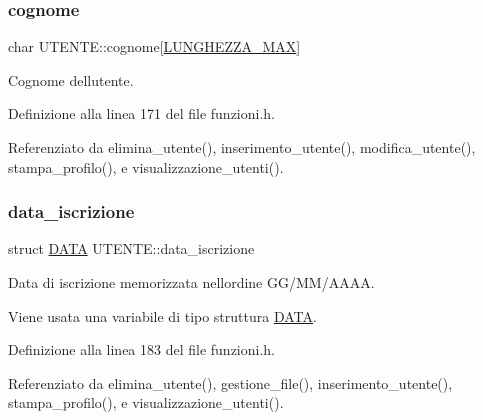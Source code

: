 \mbox{\label{struct_u_t_e_n_t_e_ad7797bd318a25af80b02a7751ebd4b9a}} 
\subsubsection{\texorpdfstring{cognome}{cognome}}
{\footnotesize\ttfamily char U\+T\+E\+N\+T\+E\+::cognome\mbox{[}\hyperlink{funzioni_8h_a2cdd71b92d6e869f8b094e32a6da6a62}{L\+U\+N\+G\+H\+E\+Z\+Z\+A\+\_\+\+M\+AX}\mbox{]}}

Cognome dell\textquotesingle{}utente. 

Definizione alla linea 171 del file funzioni.\+h.



Referenziato da elimina\+\_\+utente(), inserimento\+\_\+utente(), modifica\+\_\+utente(), stampa\+\_\+profilo(), e visualizzazione\+\_\+utenti().

\mbox{\label{struct_u_t_e_n_t_e_adad490891a61a9c3d48062baa067c1e9}} 
\subsubsection{\texorpdfstring{data\+\_\+iscrizione}{data\_iscrizione}}
{\footnotesize\ttfamily struct \hyperlink{struct_d_a_t_a}{D\+A\+TA} U\+T\+E\+N\+T\+E\+::data\+\_\+iscrizione}



Data di iscrizione memorizzata nell\textquotesingle{}ordine G\+G/\+M\+M/\+A\+A\+AA. 

Viene usata una variabile di tipo struttura \hyperlink{struct_d_a_t_a}{D\+A\+TA}. 

Definizione alla linea 183 del file funzioni.\+h.



Referenziato da elimina\+\_\+utente(), gestione\+\_\+file(), inserimento\+\_\+utente(), stampa\+\_\+profilo(), e visualizzazione\+\_\+utenti().

\mbox{\label{struct_u_t_e_n_t_e_aae6578862368788ad3bbc4af47a36ee0}} 

